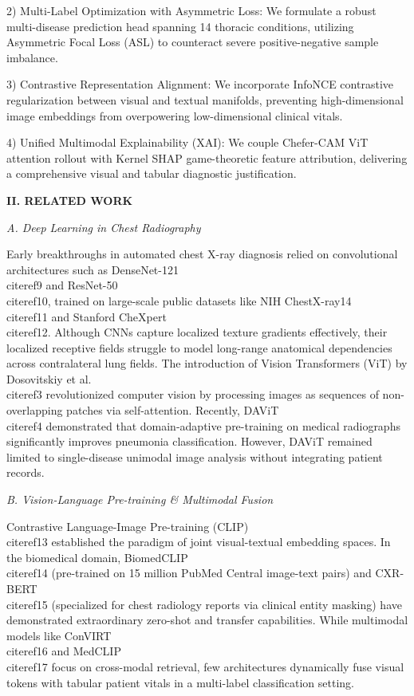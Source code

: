 \documentclass[
]{article}
\begin{document}
2) Multi-Label Optimization with Asymmetric Loss: We formulate a robust
multi-disease prediction head spanning 14 thoracic conditions, utilizing
Asymmetric Focal Loss (ASL) to counteract severe positive-negative
sample imbalance.

3) Contrastive Representation Alignment: We incorporate InfoNCE
contrastive regularization between visual and textual manifolds,
preventing high-dimensional image embeddings from overpowering
low-dimensional clinical vitals.

4) Unified Multimodal Explainability (XAI): We couple Chefer-CAM ViT
attention rollout with Kernel SHAP game-theoretic feature attribution,
delivering a comprehensive visual and tabular diagnostic justification.

\textbf{II. RELATED WORK}

\emph{A. Deep Learning in Chest Radiography}

Early breakthroughs in automated chest X-ray diagnosis relied on
convolutional architectures such as DenseNet-121 \\cite{ref9} and ResNet-50
\\cite{ref10}, trained on large-scale public datasets like NIH ChestX-ray14
\\cite{ref11} and Stanford CheXpert \\cite{ref12}. Although CNNs capture localized
texture gradients effectively, their localized receptive fields struggle
to model long-range anatomical dependencies across contralateral lung
fields. The introduction of Vision Transformers (ViT) by Dosovitskiy et
al. \\cite{ref3} revolutionized computer vision by processing images as
sequences of non-overlapping patches via self-attention. Recently, DAViT
\\cite{ref4} demonstrated that domain-adaptive pre-training on medical
radiographs significantly improves pneumonia classification. However,
DAViT remained limited to single-disease unimodal image analysis without
integrating patient records.

\emph{B. Vision-Language Pre-training \& Multimodal Fusion}

Contrastive Language-Image Pre-training (CLIP) \\cite{ref13} established the
paradigm of joint visual-textual embedding spaces. In the biomedical
domain, BiomedCLIP \\cite{ref14} (pre-trained on 15 million PubMed Central
image-text pairs) and CXR-BERT \\cite{ref15} (specialized for chest radiology
reports via clinical entity masking) have demonstrated extraordinary
zero-shot and transfer capabilities. While multimodal models like
ConVIRT \\cite{ref16} and MedCLIP \\cite{ref17} focus on cross-modal retrieval,
few architectures dynamically fuse visual tokens with tabular patient
vitals in a multi-label classification setting.
\end{document}
